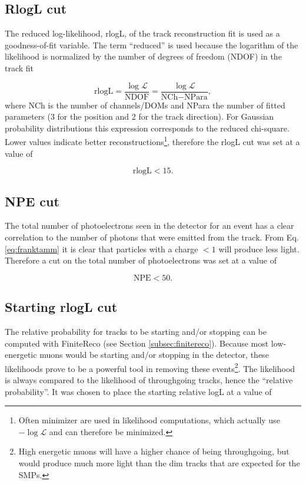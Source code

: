 \subsection{RlogL cut}
The reduced log-likelihood, rlogL, of the track reconstruction fit is used as a goodness-of-fit variable. The term ``reduced'' is used because the logarithm of the likelihood is normalized by the number of degrees of freedom (NDOF) in the track fit

\begin{equation}
\textrm{rlogL} = \frac{\log \mathcal{L}}{\textrm{NDOF}} = \frac{\log \mathcal{L}}{\textrm{NCh} - \textrm{NPara}},
\end{equation}
where NCh is the number of channels/DOMs and NPara the number of fitted parameters (3 for the position and 2 for the track direction). For Gaussian probability distributions this expression corresponds to the reduced chi-square. Lower values indicate better reconstructions\footnote{Often minimizer are used in likelihood computations, which actually use $-\log \mathcal{L}$ and can therefore be minimized.}, therefore the rlogL cut was set at a value of 

\begin{equation}
\textrm{rlogL} < 15.
\end{equation}

\subsection{NPE cut}
The total number of photoelectrons seen in the detector for an event has a clear correlation to the number of photons that were emitted from the track. From Eq. \ref{eq:franktamm} it is clear that particles with a charge $< 1$ will produce less light. Therefore a cut on the total number of photoelectrons was set at a value of 

\begin{equation}
\textrm{NPE} < 50.
\end{equation} 


\subsection{Starting rlogL cut}
The relative probability for tracks to be starting and/or stopping can be computed with FiniteReco (see Section \ref{subsec:finitereco}). Because most low-energetic muons would be starting and/or stopping in the detector, these likelihoods prove to be a powerful tool in removing these events\footnote{High energetic muons will have a higher chance of being throughgoing, but would produce much more light than the dim tracks that are expected for the SMPs.}. The likelihood is always compared to the likelihood of throughgoing tracks, hence the ``relative probability''. It was chosen to place the starting relative logL at a value of 

